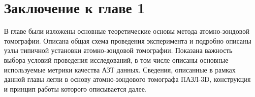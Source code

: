 \FloatBarrier

\section{Заключение к главе 1}\label{sec:ch1/sec6}

В главе были изложены основные теоретические основы метода атомно-зондовой томографии. Описана общая схема проведения эксперимента и подробно описаны узлы типичной установки атомно-зондовой томографии. Показана важность выбора условий проведения исследований, в том числе описаны основные используемые метрики качества АЗТ данных. Сведения, описанные в рамках данной главы легли в основу атомно-зондового томографа ПАЗЛ-3D, конструкция и принцип работы которого описывается далее.



























